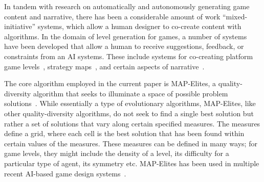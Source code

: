
In tandem with research on automatically and autonomously generating game content and narrative, there has been a considerable amount of work ``mixed-initiative'' systems, which allow a human designer to co-create content with algorithms. In the domain of level generation for games, a number of systems have been developed that allow a human to receive suggestions, feedback, or constraints from an AI systems. These include systems for co-creating platform game levels~, strategy maps~, and certain aspects of narrative~.


The core algorithm employed in the current paper is MAP-Elites, a quality-diversity algorithm that seeks to illuminate a space of possible problem solutions~. While essentially a type of evolutionary algorithms, MAP-Elites, like other quality-diversity algorithms, do not seek to find a single best solution but rather a set of solutions that vary along certain specified measures. The measures define a grid, where each cell is the best solution that has been found within certain values of the measures. These measures can be defined in many ways; for game levels, they might include the density of a level, its difficulty for a particular type of agent, its symmetry etc. MAP-Elites has been used in multiple recent AI-based game design systems~.
